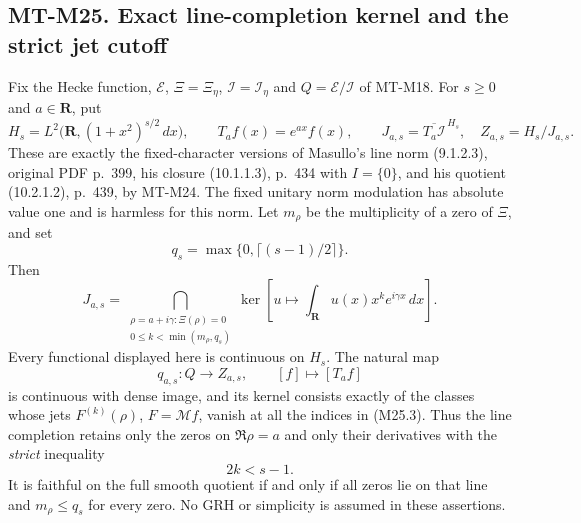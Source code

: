 \documentclass[11pt,a4paper]{article}
\begin{document}
\subsection*{MT-M25. Exact line-completion kernel and the strict jet cutoff}
Fix the Hecke function, $\mathcal E$, $\Xi=\Xi_\eta$,
$\mathcal I=\mathcal I_\eta$ and $Q=\mathcal E/\mathcal I$
of MT-M18. For $s\ge0$ and $a\in\mathbf R$, put
\[
 H_s=L^2\bigl(\mathbf R,(1+x^2)^{s/2}\,dx\bigr),
 \qquad T_af(x)=e^{ax}f(x),
 \qquad J_{a,s}=\overline{T_a\mathcal I}^{\,H_s},
 \quad Z_{a,s}=H_s/J_{a,s}.
 \tag{M25.1}
\]
These are exactly the fixed-character versions of Masullo's
line norm (9.1.2.3), original PDF p.~399, his closure
(10.1.1.3), p.~434 with $I=\{0\}$, and his quotient
(10.2.1.2), p.~439, by MT-M24. The fixed unitary norm
modulation has absolute value one and is harmless for this norm.
Let $m_\rho$ be the multiplicity of a zero of $\Xi$, and set
\[
       q_s=\max\{0,\lceil(s-1)/2\rceil\}.
 \tag{M25.2}
\]
Then
\[
 J_{a,s}=
 \bigcap_{\substack{\rho=a+i\gamma:\Xi(\rho)=0\\
                    0\le k<\min(m_\rho,q_s)}}
 \ker\left[u\longmapsto\int_{\mathbf R}
                  u(x)x^k e^{i\gamma x}\,dx\right].
 \tag{M25.3}
\]
Every functional displayed here is continuous on $H_s$.
The natural map
\[
 q_{a,s}:Q\longrightarrow Z_{a,s},\qquad[f]\longmapsto[T_af]
 \tag{M25.4}
\]
is continuous with dense image, and its kernel consists exactly
of the classes whose jets $F^{(k)}(\rho)$, $F=\mathcal Mf$,
vanish at all the indices in (M25.3). Thus the line completion
retains only the zeros on $\Re\rho=a$ and only their derivatives
with the \emph{strict} inequality
\[
                         2k<s-1.
 \tag{M25.5}
\]
It is faithful on the full smooth quotient if and only if all
zeros lie on that line and $m_\rho\le q_s$ for every zero.
No GRH or simplicity is assumed in these assertions.
\end{document}
